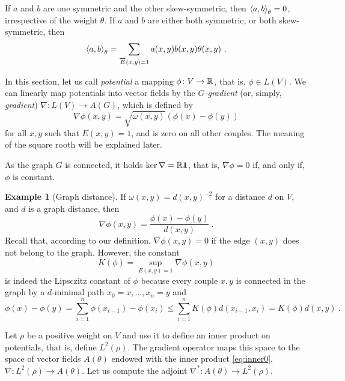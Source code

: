 \documentclass[12pt,a4paper]{amsart}
\theoremstyle{definition}
\newtheorem{example}{Example}
\begin{document}
If $a$ and $b$ are one symmetric and the other skew-symmetric, then
$\left\langle a,b\right\rangle_{\theta} = 0$, irrespective of the weight $\theta$.
If $a$ and $b$ are either both symmetric, or both skew-symmetric, then
\begin{equation}\label{eq:inner0}
  \left\langle a,b\right\rangle_{\theta} = \sum_{\overrightarrow E(x,y)=1}
  a(x,y)b(x,y) \theta(x,y) \ .
\end{equation}

In this section, let us call \emph{potential} a mapping
$\phi \colon V \to \mathbb{R}$, that is, $\phi\in L(V)$. We can linearly
map potentials into vector fields by the \emph{$G$-gradient} (or,
simply, \emph{gradient}) $\nabla \colon L(V) \to A(G)$, which is
defined by
\begin{equation}\label{eq:nabla}
  \nabla \phi(x,y) = \sqrt {\omega(x,y)} (\phi(x) - \phi(y))
\end{equation}
for all $x,y$ such that $E(x,y)=1$, and is zero on all other
couples. The meaning of the square rooth will be explained later.

As the graph $G$ is connected, it holds $\ker \nabla = \mathbb{R} \bm 1$,
that is, $\nabla\phi=0$ if, and only if, $\phi$ is constant.

\begin{example}[Graph distance] If $\omega(x,y) = d(x,y)^{-2}$ for a distance $d$ on
$V$, and $d$ is a graph distance, then
\begin{equation*}
  \nabla \phi (x,y)=\frac{\phi(x) - \phi(y)}{d(x,y)} \ .
\end{equation*}
Recall that, according to our definition, $\nabla \phi (x,y) = 0$ if
the edge $(x,y)$ does not belong to the graph. However, the constant
\begin{equation*}
  K(\phi) = \sup_{E(x,y)=1} \nabla \phi(x,y)
\end{equation*}
is indeed the Lipsczitz constant of $\phi$ because every couple $x,y$
is connected in the graph by a $d$-minimal path $x_0=x, \dots, x_n=y$
and
\begin{equation*}
  \phi(x) - \phi(y) = \sum_{i=1}^n \phi(x_{i-1}) - \phi(x_i) \leq
  \sum_{i=1}^n K(\phi) d(x_{i-1},x_i) = K(\phi) d(x,y) \ . 
\end{equation*}
\end{example}

Let $\rho$ be a positive weight on $V$ and use it to define an inner
product on potentials, that is, define $L^2(\rho)$. The gradient
operator maps this space to the space of vector fields $A(\theta)$
endowed with the inner product \eqref{eq:inner0},
$\nabla \colon L^2(\rho) \to A(\theta)$.  Let us compute the adjoint
$\nabla^* \colon A(\theta) \to L^2(\rho)$.
\end{document}
